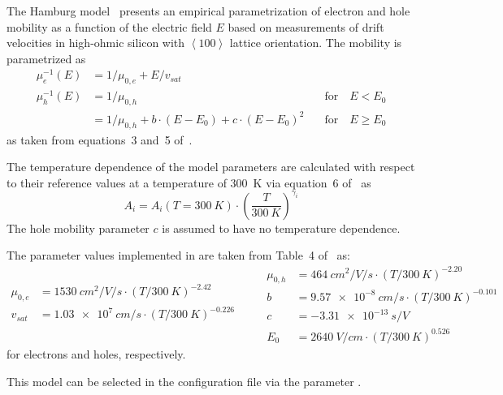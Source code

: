The Hamburg model~\cite{hamburg} presents an empirical parametrization of electron and hole mobility as a function of the electric field $E$ based on measurements of drift velocities in high-ohmic silicon with $\left<100\right>$ lattice orientation.
The mobility is parametrized as
\begin{align}
    \label{eq:mob:ham}
    \mu_e^{-1}(E) &= 1 / \mu_{0,e} + E / v_{sat} \nonumber \\
    \mu_h^{-1}(E) &= 1 / \mu_{0,h} &\quad \textrm{for} \quad E < E_0 \nonumber \\
                  &= 1 / \mu_{0,h} + b \cdot (E - E_0) + c \cdot (E - E_0)^2 &\quad \textrm{for} \quad E \geq E_0
\end{align}
as taken from equations~3 and~5 of~\cite{hamburg}.

The temperature dependence of the model parameters are calculated with respect to their reference values at a temperature of \SI{300}{K} via equation~6 of~\cite{hamburg} as
\begin{equation}
    \label{eq:mob:ham:temp}
    A_i = A_i(T = \SI{300}{K}) \cdot \left(\frac{T}{\SI{300}{K}}\right)^{\gamma_i}
\end{equation}
The hole mobility parameter $c$ is assumed to have no temperature dependence.

The parameter values implemented in \apsq are taken from Table~4 of~\cite{hamburg} as:
\begin{equation*}
    \begin{split}
        \mu_{0,e} &= \SI{1530}{cm^2 \per V \per s} \cdot (T / \SI{300}{K})^{-2.42}\\
        v_{sat}   &= \SI{1.03e7}{cm \per s} \cdot (T / \SI{300}{K})^{-0.226}\\
    \end{split}
    \qquad
    \begin{split}
      \mu_{0,h} &= \SI{464}{cm^2 \per V \per s} \cdot (T / \SI{300}{K})^{-2.20}\\
        b       &= \SI{9.57e-8}{cm \per s} \cdot (T / \SI{300}{K})^{-0.101}\\
        c       &= \SI{-3.31e-13}{s \per V}\\
        E_0     &= \SI{2640}{V \per cm} \cdot (T / \SI{300}{K})^{0.526}
    \end{split}
\end{equation*}
for electrons and holes, respectively.

This model can be selected in the configuration file via the parameter .



